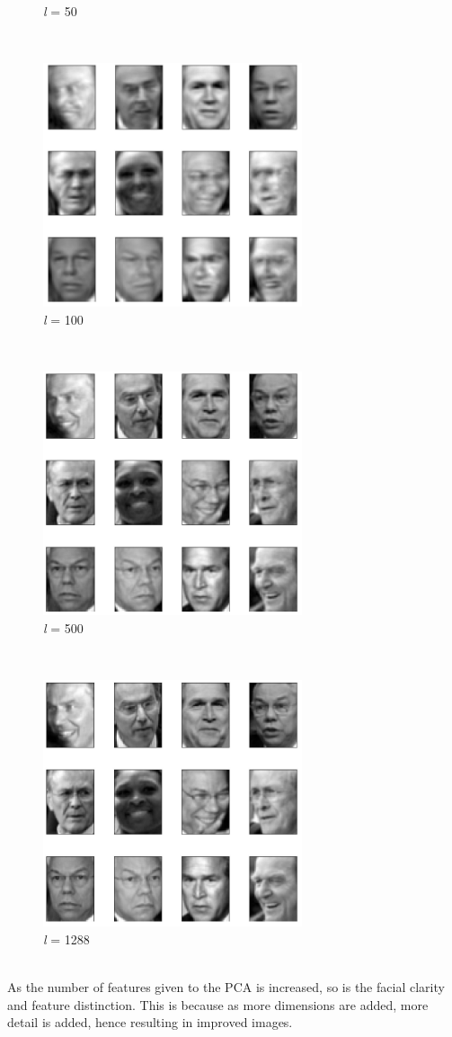\documentclass[11pt]{article}
\begin{document}
\begin{enumerate}
{\begin{figure}[!htbp]
    \caption{\textit{l} = 50} 
\end{figure} \\
\begin{figure}[!htbp]
    \centering
    \includegraphics[width=3in]{c100.png}
    \caption{\textit{l} = 100} 
\end{figure} \\
\begin{figure}[!htbp]
    \centering
    \includegraphics[width=3in]{c500.png}
    \caption{\textit{l} = 500} 
\end{figure} \\
\begin{figure}[!htbp]
    \centering
    \includegraphics[width=3in]{c1288.png}
    \caption{\textit{l} = 1288} 
\end{figure} \\
As the number of features given to the PCA is increased, so is the facial clarity and feature distinction. This is because as more dimensions are added, more detail is added, hence resulting in improved images.
}
\end{enumerate}
\newpage
\end{document}
